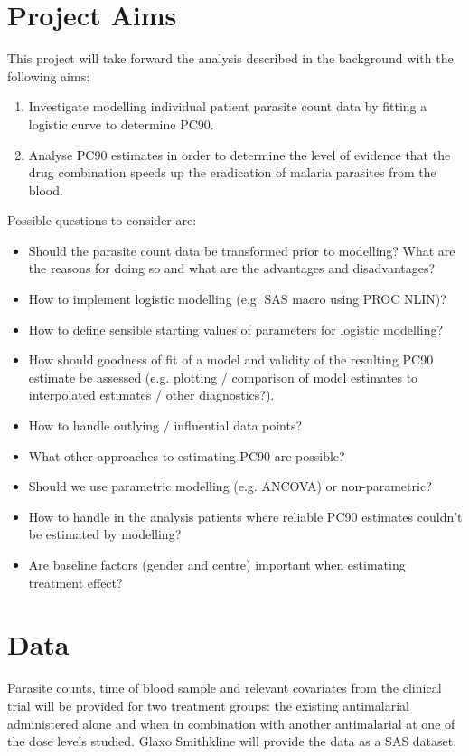 \section*{Project Aims} 
This project will take forward the analysis described in the background with the following aims:
\begin{enumerate} 
\item Investigate modelling individual patient parasite count data by fitting a logistic curve to determine PC90. 
\item Analyse PC90 estimates in order to determine the level of evidence that the drug combination speeds up the eradication of malaria parasites from the blood.
\end{enumerate} 
Possible questions to consider are: 
\begin{itemize}
\item Should the parasite count data be transformed prior to modelling? What are the reasons for doing so and what are the advantages and disadvantages? 
\item How to implement logistic modelling (e.g. SAS macro using PROC NLIN)?  
\item How to define sensible starting values of parameters for logistic modelling? 
\item How should goodness of fit of a model and validity of the resulting PC90 estimate be assessed (e.g. plotting / comparison of model estimates to interpolated estimates / other diagnostics?). 
\item How to handle outlying / influential data points? 
\item What other approaches to estimating PC90 are possible? 
\item Should we use parametric modelling (e.g. ANCOVA) or non-parametric? 
\item How to handle in the analysis patients where reliable PC90 estimates couldn't be estimated by modelling? 
\item Are baseline factors (gender and centre) important when estimating treatment effect? 
\end{itemize}
\section*{Data} 
Parasite counts, time of blood sample and relevant covariates from the clinical trial will be provided for two treatment groups: the existing antimalarial administered alone and when in combination with another antimalarial at one of the dose levels studied. Glaxo Smithkline will provide the data as a SAS dataset. 
